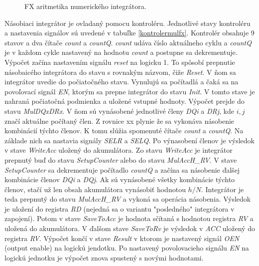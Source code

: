 \bigskip
\begin{figure}[h]
\centering
{}
\caption{FX aritmetika numerického integrátora.}
\label{fxmularitmetic}
\end{figure}
\bigskip

Násobiaci integrátor je ovladaný pomocu kontroléru. Jednotlivé stavy kontroléru a nastavenia signálov sú uvedené v tabuľke \ref{kontrolermulfx}. Kontrolér obsahuje 9 stavov a dva čítače \textit{count} a \textit{countQ}. \textit{count} udáva číslo aktuálneho cyklu a \textit{countQ} je v každom cykle nastavený na hodnotu \textit{count} a postupne sa dekrementuje. Výpočet začína nastavením signálu \textit{reset} na logicku 1. To spôsobí prepnutie násobaicého integrátora do stavu s rovnakým názvom, čiže \textit{Reset}. V ňom sa integrátor uvedie do počiatočného stavu. Vynulujú sa počítadlá a čaká sa na povoľovací signál \textit{EN}, ktorým sa prepne integrátor do stavu \textit{Init}. V tomto stave je nahraná počiatočná podmienka a uložené vstupné hodnoty. Výpočet prejde do stavu \textit{MulDQxDRx}. V ňom sú vynásobené jednotlivé členy \textit{DQi} a \textit{DRj}, kde $ i, j $ značí aktuálne počítaný člen. Z rovnice xx plynie že sa vykonáva násobenie kombinácií týchto členov. K tomu slúžia spomenuté čítače \textit{count} a \textit{countQ}. Na základe nich sa nastavia signály \textit{SELR} a \textit{SELQ}. Po výnasobení členov je výsledok v stave \textit{WriteAcc} uložený do akumulátora. Zo stavu \textit{WriteAcc} je integrátor prepnutý buď do stavu \textit{SetupCounter} alebo do stavu \textit{MulAccH\_RV}. V stave \textit{SetupCounter} sa dekrementuje počítadlo \textit{countQ} a začína sa násobenie ďalšej kombinácie členov \textit{DQi} a \textit{DQj}. Ak sú vynásobené všetky kombinácie týchto členov, stačí už len obsah akumulátora vynásobiť hodnotou $ h/N $. Integrátor je teda prepnutý do stavu \textit{MulAccH\_RV} a vykoná sa operácia násobenia. Výsledok je uložení do registra \textit{RD} (nejedná sa o variantu "posledného" integrátora v zapojení). Potom v stave \textit{SaveToAcc} je hodnota sčítaná s hodnotou registra \textit{RV} a uložená do akumulátora. V ďalšom stave \textit{SaveToRv} je výsledok v \textit{ACC} uložený do registra \textit{RV}. Výpočet končí v stave \textit{Result} v ktorom je nastavený signál \textit{OEN} (output enable) na logickú jendotku. Po nastavený povolovacieho signálu \textit{EN} na logickú jednotku je výpočet znova spustený s novými hodnotami.

